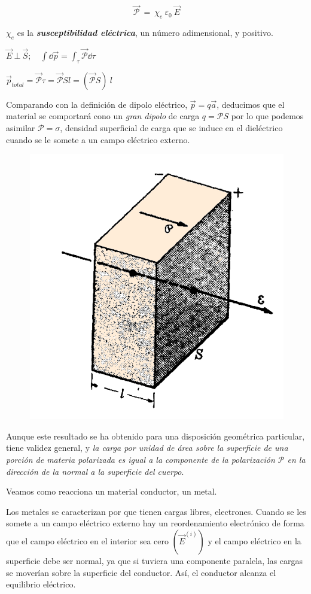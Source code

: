 \begin{equation}
	\overrightarrow{\mathcal P}\ = \ \chi_e \ \varepsilon_0 \ \vec E
\end{equation}

$\chi_e$ es la \emph{\textbf{susceptibilidad eléctrica}}, un número adimensional, y positivo.

\begin{multicols}{2}
$\vec E \ \bot \ \vec S; \quad \displaystyle \int \dd \vec p = \int_\tau \overrightarrow{\mathcal P} \dd \tau$

$\vec p_{total}=\overrightarrow{\mathcal P} \tau=\overrightarrow{\mathcal P} S l=(\overrightarrow{\mathcal P} S)\ l$

Comparando con la definición de dipolo eléctrico, $\vec p=q\vec a$,
deducimos que el material se comportará cono un \emph{gran dipolo} de carga $q=\mathcal P S$ por lo que podemos asimilar $\mathcal P=\sigma$, densidad superficial de carga que se induce en el dieléctrico cuando se le somete a un campo eléctrico externo.

\begin{figure}[H]
	\centering
	\includegraphics[width=.55\textwidth]{imagenes/imagenes24/T24IM08.png}
\end{figure}
\end{multicols}


Aunque este resultado se ha obtenido para una disposición geométrica particular, tiene validez general, y \emph{la carga por unidad de área sobre la superficie de una porción de materia polarizada es igual a la componente de la polarización $\mathcal P$ en la dirección de la normal a la superficie del cuerpo}.


Veamos como reacciona un material conductor, un metal. 

Los metales se caracterizan por que tienen cargas libres, electrones. Cuando se les somete a un campo eléctrico externo hay un reordenamiento electrónico de forma que el campo eléctrico en el interior sea cero $(\vec E^{(i)})$ y el campo eléctrico en la superficie debe ser normal, ya que si tuviera una componente paralela, las cargas se moverían sobre la superficie del conductor. Así, el conductor alcanza el equilibrio eléctrico.

